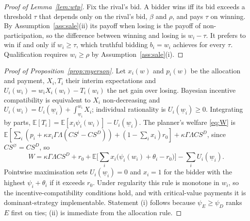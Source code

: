 \documentclass[12pt,a4paper]{article}
\theoremstyle{definition}
\theoremstyle{remark}
\newcommand{\E}{\mathbb{E}}
\begin{document}
\begin{proof}[Proof of Lemma~\ref{lem:wtp}]
Fix the rival's bid. A bidder wins iff its bid exceeds a threshold $\tau$ that depends only on the rival's bid, $\beta$ and $\rho$, and pays $\tau$ on winning. By Assumption~\ref{ass:sale}(ii) its payoff when losing is the payoff of non-participation, so the difference between winning and losing is $w_i-\tau$. It prefers to win if and only if $w_i\ge\tau$, which truthful bidding $b_i=w_i$ achieves for every $\tau$. Qualification requires $w_i\ge\rho$ by Assumption~\ref{ass:sale}(i).
\end{proof}

\begin{proof}[Proof of Proposition~\ref{prop:myerson}]
Let $x_i(w)$ and $p_i(w)$ be the allocation and payment, $X_i,T_i$ their interim expectations and $U_i(w_i)=w_iX_i(w_i)-T_i(w_i)$ the net gain over losing. Bayesian incentive compatibility is equivalent to $X_i$ non-decreasing and $U_i(w_i)=U_i(\underline w_i)+\int_{\underline w_i}^{w_i}X_i$; individual rationality is $U_i(\underline w_i)\ge0$. Integrating by parts, $\E[T_i]=\E[x_i\psi_i(w_i)]-U_i(\underline w_i)$. The planner's welfare \eqref{eq:W} is $\E[\sum_i(p_i+\kappa x_i\Gamma\Lambda(CS^i-CS^D))+(1-\sum_ix_i)r_0]+\kappa\Gamma\Lambda CS^D$, since $CS^\varnothing=CS^D$, so
\[
W=\kappa\Gamma\Lambda CS^D+r_0+\E\Big[\sum_ix_i\big(\psi_i(w_i)+\theta_i-r_0\big)\Big]-\sum_iU_i(\underline w_i).
\]
Pointwise maximisation sets $U_i(\underline w_i)=0$ and $x_i=1$ for the bidder with the highest $\psi_i+\theta_i$ if it exceeds $r_0$. Under regularity this rule is monotone in $w_i$, so the incentive-compatibility conditions hold, and with critical-value payments it is dominant-strategy implementable. Statement (i) follows because $\psi_E\ge\psi_D$ ranks $E$ first on ties; (ii) is immediate from the allocation rule.
\end{proof}
\end{document}
